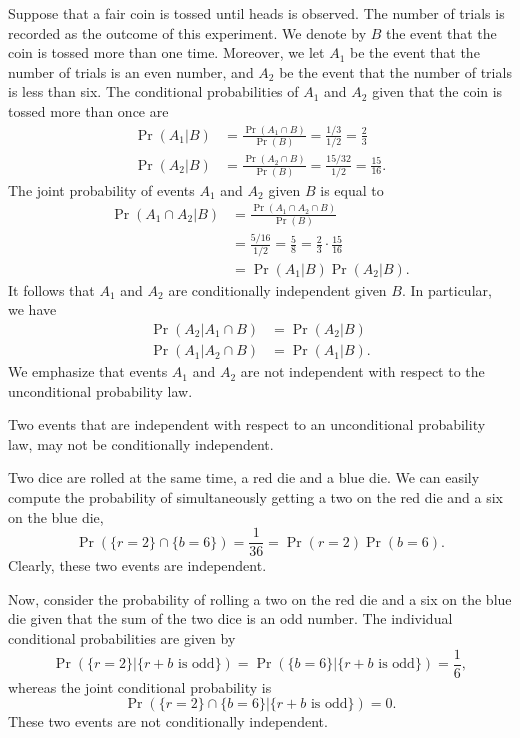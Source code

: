 \begin{example}
Suppose that a fair coin is tossed until heads is observed.
The number of trials is recorded as the outcome of this experiment.
We denote by $B$ the event that the coin is tossed more than one time.
Moreover, we let $A_1$ be the event that the number of trials is an even number, and $A_2$ be the event that the number of trials is less than six.
The conditional probabilities of $A_1$ and $A_2$ given that the coin is tossed more than once are
\begin{align*}
\Pr (A_1 | B) &= \frac{ \Pr (A_1 \cap B) }{ \Pr (B) }
= \frac{1/3}{1/2} = \frac{2}{3} \\
\Pr (A_2 | B) &= \frac{ \Pr (A_2 \cap B) }{ \Pr (B) }
= \frac{15/32}{1/2} = \frac{15}{16} .
\end{align*}
The joint probability of events $A_1$ and $A_2$ given $B$ is equal to
\begin{equation*}
\begin{split}
\Pr (A_1 \cap A_2 | B) &= \frac{ \Pr (A_1 \cap A_2 \cap B) }{ \Pr (B) } \\
&= \frac{5/16}{1/2} = \frac{5}{8} = \frac{2}{3} \cdot \frac{15}{16} \\
&= \Pr (A_1 | B) \Pr (A_2 | B) .
\end{split}
\end{equation*}
It follows that $A_1$ and $A_2$ are conditionally independent given $B$.
In particular, we have
\begin{align*}
\Pr (A_2 | A_1 \cap  B) &= \Pr (A_2 | B) \\
\Pr (A_1 | A_2 \cap  B) &= \Pr (A_1 | B) .
\end{align*}
We emphasize that events $A_1$ and $A_2$ are not independent with respect to the unconditional probability law.
\end{example}

Two events that are independent with respect to an unconditional probability law, may not be conditionally independent.

\begin{example}
Two dice are rolled at the same time, a red die and a blue die.
We can easily compute the probability of simultaneously getting a two on the red die and a six on the blue die,
\begin{equation*}
\Pr (\{ r=2 \} \cap \{ b=6 \}) = \frac{1}{36}
= \Pr ( r=2 ) \Pr ( b=6 ) .
\end{equation*}
Clearly, these two events are independent.

Now, consider the probability of rolling a two on the red die and a six on the blue die given that the sum of the two dice is an odd number.
The individual conditional probabilities are given by
\begin{equation*}
\Pr (\{ r=2 \} | \{ r+b \text{ is odd} \})
= \Pr (\{ b=6 \} | \{ r+b \text{ is odd} \})
= \frac{1}{6},
\end{equation*}
whereas the joint conditional probability is
\begin{equation*}
\Pr (\{ r=2 \} \cap \{ b=6 \} | \{ r+b \text{ is odd} \})
= 0 .
\end{equation*}
These two events are not conditionally independent.
\end{example}

